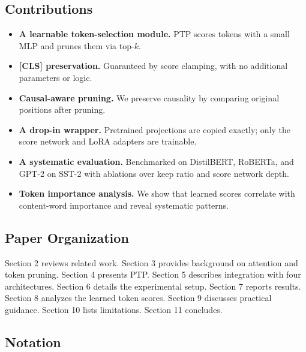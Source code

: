 {\begin{enumerate}
\end{enumerate}
\subsection{Contributions}

\begin{itemize}
\item \textbf{A learnable token-selection module.} PTP scores tokens with a small
  MLP and prunes them via top-$k$.
\item \textbf{[CLS] preservation.} Guaranteed by score clamping, with no additional
  parameters or logic.
\item \textbf{Causal-aware pruning.} We preserve causality by comparing original
  positions after pruning.
\item \textbf{A drop-in wrapper.} Pretrained projections are copied exactly; only
  the score network and LoRA adapters are trainable.
\item \textbf{A systematic evaluation.} Benchmarked on DistilBERT, RoBERTa, and
  GPT-2 on SST-2 with ablations over keep ratio and score network depth.
\item \textbf{Token importance analysis.} We show that learned scores correlate with
  content-word importance and reveal systematic patterns.

\end{itemize}
\subsection{Paper Organization}

Section 2 reviews related work. Section 3 provides background on attention 
and token pruning. Section 4 presents PTP. Section 5 describes integration 
with four architectures. Section 6 details the experimental setup. Section 
7 reports results. Section 8 analyzes the learned token scores. Section 9 
discusses practical guidance. Section 10 lists limitations. Section 11 
concludes.



\subsection{Notation}

}
